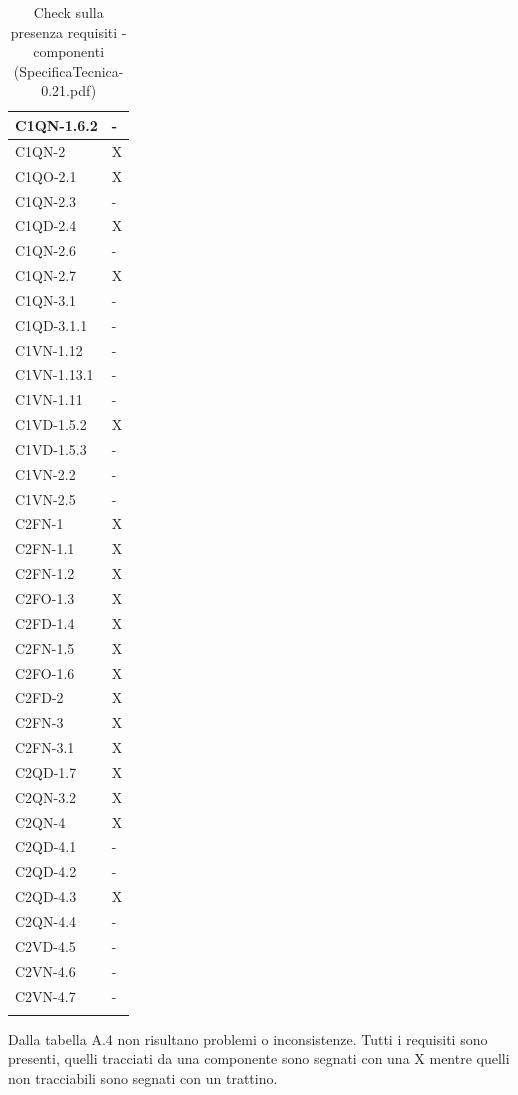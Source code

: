 \begin{footnotesize}
\begin{longtable}{|p{}|p{}|}
 C1QN-1.6.2&-   \\ \hline
 C1QN-2&X \\ \hline
 C1QO-2.1&X \\ \hline
 C1QN-2.3&-  \\ \hline
 C1QD-2.4&X  \\ \hline
 C1QN-2.6&-  \\ \hline
 C1QN-2.7&X    \\ \hline
 C1QN-3.1&-   \\ \hline
 C1QD-3.1.1&-    \\ \hline
 C1VN-1.12&- \\ \hline
 C1VN-1.13.1&-  \\ \hline
 C1VN-1.11&-  \\ \hline
 C1VD-1.5.2&X \\ \hline
 C1VD-1.5.3&-   \\ \hline
 C1VN-2.2&- \\ \hline
 C1VN-2.5&-  \\ \hline
 C2FN-1&X    \\ \hline
 C2FN-1.1&X    \\ \hline
 C2FN-1.2&X   \\ \hline
 C2FO-1.3&X    \\ \hline
 C2FD-1.4&X   \\ \hline
 C2FN-1.5&X   \\ \hline
 C2FO-1.6&X   \\ \hline
 C2FD-2&X    \\ \hline
 C2FN-3&X   \\ \hline
 C2FN-3.1&X   \\ \hline
 C2QD-1.7&X   \\ \hline
 C2QN-3.2&X   \\ \hline
 C2QN-4 &X  \\ \hline
 C2QD-4.1&-    \\ \hline
 C2QD-4.2&-   \\ \hline
 C2QD-4.3&X   \\ \hline
 C2QN-4.4&-  \\ \hline
 C2VD-4.5&-   \\ \hline
 C2VN-4.6&-    \\ \hline
 C2VN-4.7&-  \\ \hline

\caption{Check sulla presenza requisiti - componenti
(SpecificaTecnica-0.21.pdf)}
\end{longtable}
\end{footnotesize}

Dalla tabella A.4 non risultano problemi o inconsistenze. Tutti i requisiti sono
presenti, quelli tracciati da una componente sono segnati con una X mentre
quelli non tracciabili sono segnati con un trattino.

